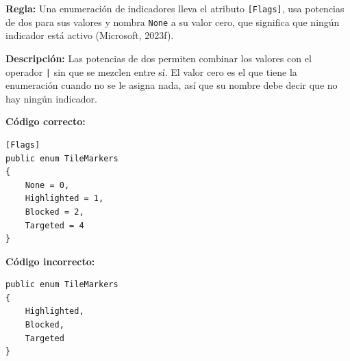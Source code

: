 \textbf{Regla:} Una enumeración de indicadores lleva el atributo \texttt{[Flags]}, usa potencias de dos para sus valores y nombra \texttt{None} a su valor cero, que significa que ningún indicador está activo (Microsoft, 2023f).

\textbf{Descripción:} Las potencias de dos permiten combinar los valores con el operador \texttt{|} sin que se mezclen entre sí. El valor cero es el que tiene la enumeración cuando no se le asigna nada, así que su nombre debe decir que no hay ningún indicador.

\textbf{Código correcto:}
\begin{lstlisting}[style=csharpstyle]
[Flags]
public enum TileMarkers
{
    None = 0,
    Highlighted = 1,
    Blocked = 2,
    Targeted = 4
}
\end{lstlisting}

\textbf{Código incorrecto:}
\begin{lstlisting}[style=csharpstyle]
public enum TileMarkers
{
    Highlighted,
    Blocked,
    Targeted
}
\end{lstlisting}
